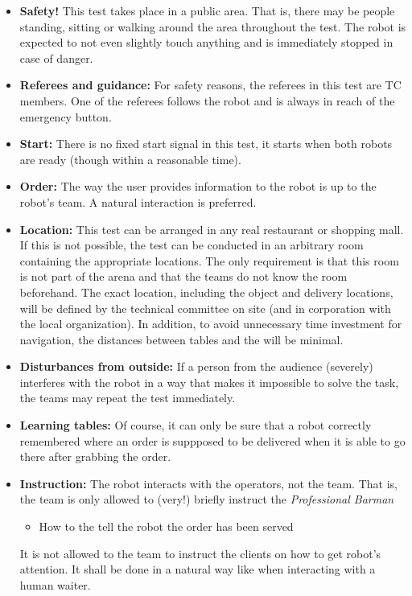 \begin{itemize}
	\item \textbf{Safety!} This test takes place in a public area. That is, there may be people standing, sitting or walking around the area throughout the test. The robot is expected to not even slightly touch anything and is immediately stopped in case of danger.

	\item \textbf{Referees and guidance:} For safety reasons, the referees in this test are TC members. One of the referees follows the robot and is always in reach of the emergency button.

	\item \textbf{Start:} There is no fixed start signal in this test, it starts when both robots are ready (though within a reasonable time).

	\item \textbf{Order:} The way the user provides information to the robot is up to the robot's team. A natural interaction is preferred.

	\item \textbf{Location:} This test can be arranged in any real restaurant or shopping mall. If this is not possible, the test can be conducted in an arbitrary room containing the appropriate locations.
	  The only requirement is that this room is not part of the arena and that the teams do not know the room beforehand.
	  The exact location, including the object and delivery locations, will be defined by the technical committee on site (and in corporation with the local organization).
	  In addition, to avoid unnecessary time investment for navigation, the distances between tables and the  will be minimal.

	\item \textbf{Disturbances from outside:} If a person from the audience (severely) interferes with the robot in a way that makes it impossible to solve the task, the teams may repeat the test immediately.

	\item \textbf{Learning tables:} Of course, it can only be sure that a robot correctly remembered where an order is suppposed to be delivered when it is able to go there after grabbing the order.

	\item \textbf{Instruction:} The robot interacts with the operators, not the team. That is, the team is only allowed to (very!) briefly instruct the \textit{Professional Barman}
	\begin{itemize}
		\item How to the tell the robot the order has been served
	\end{itemize}
	It is not allowed to the team to instruct the clients on how to get robot's attention. It shall be done in a natural way like when interacting with a human waiter.


\end{itemize}
